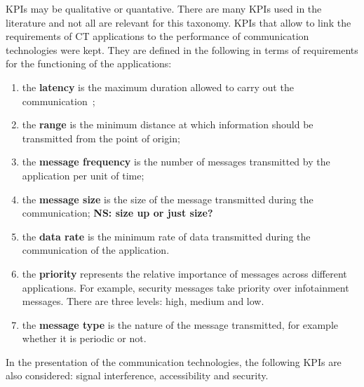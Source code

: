 
\acrshort{KPI}s may be qualitative or quantative. There are many \acrshort{KPI}s used in the literature and not all are relevant for this taxonomy. \acrshort{KPI}s that allow to link the requirements of \acrshort{CT} applications to the performance of communication technologies were kept. They are defined in the following in terms of requirements for the functioning of the applications:

\begin{enumerate}
\item the {\bf latency} is the maximum duration allowed to carry out the communication~\cite{etsi_etsi_tr_102_638_intelligent_2009}; %
\item the {\bf range} is the minimum distance at which information should be transmitted from the point of origin;
\item the {\bf message frequency} is the number of messages transmitted by the application per unit of time;
\item the {\bf message size} is the size of the message transmitted during the communication; {\bf NS: size up or just size?}
\item the {\bf data rate} is the minimum rate of data transmitted during the communication of the application. %
\item the {\bf priority} represents the relative importance of messages across different applications. For example, security messages take priority over infotainment messages. There are three levels: high, medium and low. 
\item the {\bf message type} is the nature of the message transmitted, for example whether it is periodic or not. 
\end{enumerate}

In the presentation of the communication technologies, the following \acrshort{KPI}s are also considered: signal interference, accessibility and security.

